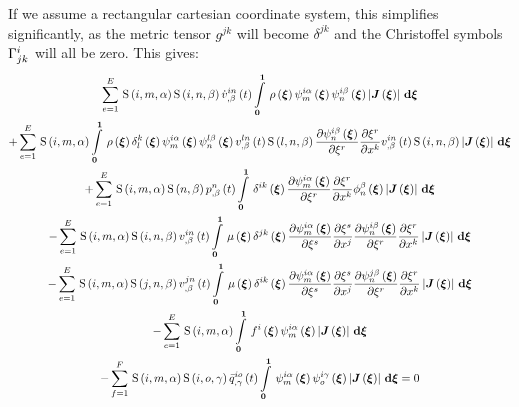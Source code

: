 If we assume a rectangular cartesian coordinate system, this simplifies
significantly, as the metric tensor $g^{jk}$ will become $\delta^{jk}$ and the
Christoffel symbols $ \Gamma^{i}_{jk} $ will all be zero. This gives:
\begin{multline}
  \gsum{e=1}{E}{\idxgsf{i}{m}{\alpha}\idxgsf{i}{n}{\beta}\fnof{\idxnodedof{\dot{v}}{i}{n}{\beta}}{t}
    \gint{\vectr{0}}{\vectr{1}}{\fnof{\rho}{\vectr{\xi}}
      \idxgbfn{i}{m}{\alpha}{\vectr{\xi}}\idxgbfn{i}{n}{\beta}{\vectr{\xi}}
      \abs{\fnof{\matr{J}}{\vectr{\xi}}}}{\vectr{\xi}}}\\
  +\gsum{e=1}{E}{\idxgsf{i}{m}{\alpha}\gint{\vectr{0}}{\vectr{1}}{\fnof{\rho}{\vectr{\xi}}
      \fnof{\delta^{k}_{l}}{\vectr{\xi}}\idxgbfn{i}{m}{\alpha}{\vectr{\xi}}\idxgbfn{l}{n}{\beta}{\vectr{\xi}}
      \fnof{\idxnodedof{v}{l}{n}{\beta}}{t}\idxgsf{l}{n}{\beta}\delby{\idxgbfn{i}{n}{\beta}{\vectr{\xi}}}{\xi^{r}}
      \delby{\xi^{r}}{x^{k}}\fnof{\idxnodedof{v}{i}{n}{\beta}}{t}\idxgsf{i}{n}{\beta}
      \abs{\fnof{\matr{J}}{\vectr{\xi}}}}{\vectr{\xi}}}\\
  +\gsum{e=1}{E}{\idxgsf{i}{m}{\alpha}\gsf{n}{\beta}\fnof{\nodedof{p}{n}{\beta}}{t}\gint{\vectr{0}}{\vectr{1}}{
      \fnof{\delta^{ik}}{\vectr{\xi}}\delby{\idxgbfn{i}{m}{\alpha}{\vectr{\xi}}}{\xi^{r}}\delby{\xi^{r}}{x^{k}}
      \altgbfn{n}{\beta}{\vectr{\xi}}\abs{\fnof{\matr{J}}{\vectr{\xi}}}}{\vectr{\xi}}}\\
  -\gsum{e=1}{E}{\idxgsf{i}{m}{\alpha}\idxgsf{i}{n}{\beta}\fnof{\idxnodedof{v}{i}{n}{\beta}}{t}\gint{\vectr{0}}{\vectr{1}}{
      \fnof{\mu}{\vectr{\xi}}\fnof{\delta^{jk}}{\vectr{\xi}}\delby{\idxgbfn{i}{m}{\alpha}{\vectr{\xi}}}{\xi^{s}}
      \delby{\xi^{s}}{x^{j}}\delby{\idxgbfn{i}{n}{\beta}{\vectr{\xi}}}{\xi^{r}}\delby{\xi^{r}}{x^{k}}
      \abs{\fnof{\matr{J}}{\vectr{\xi}}}}{\vectr{\xi}}}\\
  -\gsum{e=1}{E}{\idxgsf{i}{m}{\alpha}\idxgsf{j}{n}{\beta}\fnof{\idxnodedof{v}{j}{n}{\beta}}{t}
    \gint{\vectr{0}}{\vectr{1}}{\fnof{\mu}{\vectr{\xi}}\fnof{\delta^{ik}}{\vectr{\xi}}\delby{\idxgbfn{i}{m}{\alpha}{\vectr{\xi}}}{\xi^{s}}
      \delby{\xi^{s}}{x^{j}}\delby{\idxgbfn{j}{n}{\beta}{\vectr{\xi}}}{\xi^{r}}\delby{\xi^{r}}{x^{k}}
      \abs{\fnof{\matr{J}}{\vectr{\xi}}}}{\vectr{\xi}}} \\
  -\gsum{e=1}{E}{\idxgsf{i}{m}{\alpha}\gint{\vectr{0}}{\vectr{1}}{\fnof{f^{i}}{\vectr{\xi}}\idxgbfn{i}{m}{\alpha}{\vectr{\xi}}\abs{\fnof{\matr{J}}{\vectr{\xi}}}}{\vectr{\xi}}}\\
  -\gsum{f=1}{F}{\idxgsf{i}{m}{\alpha}\idxgsf{i}{o}{\gamma}\fnof{\idxnodedof{\bar{q}}{i}{o}{\gamma}}{t}
    \gint{\vectr{0}}{\vectr{1}}{\idxgbfn{i}{m}{\alpha}{\vectr{\xi}}\idxgbfn{i}{o}{\gamma}{\vectr{\xi}}
      \abs{\fnof{\matr{J}}{\vectr{\xi}}}}{\vectr{\xi}}}=0
  \label{eqn:NSEFEM5RC}
\end{multline}

